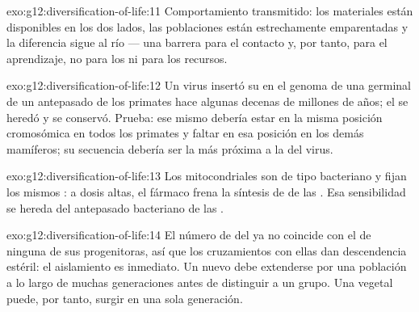 \begin{solution}{exo:g12:diversification-of-life:11}
Comportamiento transmitido: los materiales están disponibles en los dos
lados, las poblaciones están estrechamente emparentadas y la diferencia
sigue al río --- una barrera para el contacto y, por tanto, para el
aprendizaje, no para los  ni para los recursos.
\end{solution}

\begin{solution}{exo:g12:diversification-of-life:12}
Un virus insertó su  en el genoma de una  germinal de un
antepasado de los primates hace algunas decenas de millones de años; el
 se heredó y se conservó. Prueba: ese mismo  debería estar en la
misma posición cromosómica en todos los primates y faltar en esa
posición en los demás mamíferos; su secuencia debería ser la más
próxima a la del virus.
\end{solution}

\begin{solution}{exo:g12:diversification-of-life:13}
Los  mitocondriales son de tipo bacteriano y fijan los mismos
: a dosis altas, el fármaco frena la síntesis de 
de las . Esa sensibilidad se hereda del antepasado
bacteriano de las .
\end{solution}

\begin{solution}{exo:g12:diversification-of-life:14}
El número de  del  ya no coincide con el de
ninguna de sus progenitoras, así que los cruzamientos con ellas dan
descendencia estéril: el aislamiento es inmediato. Un  nuevo debe
extenderse por una población a lo largo de muchas generaciones antes de
distinguir a un grupo. Una  vegetal puede, por tanto, surgir en
una sola generación.
\end{solution}

